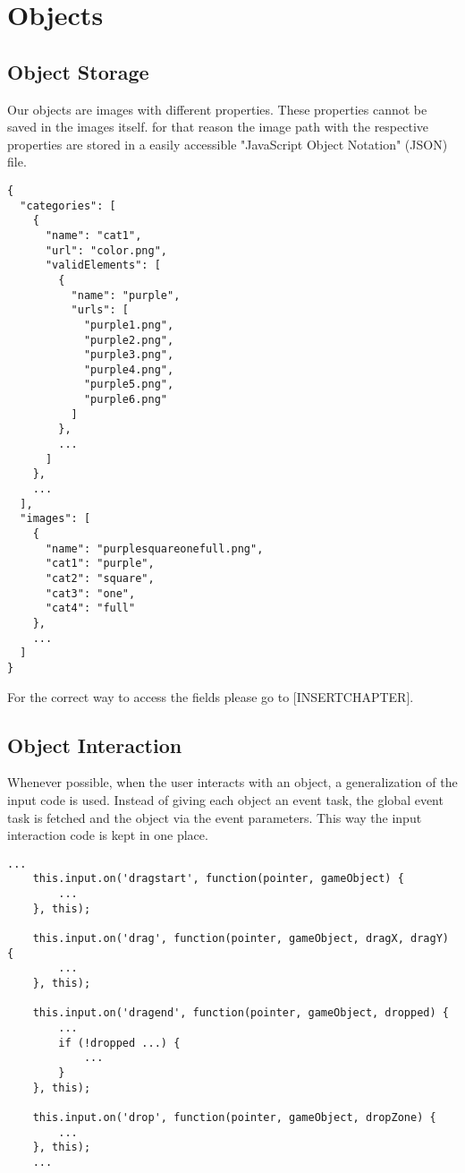 \section{Objects}\label{sec:objects}
\subsection{Object Storage}\label{subsec:object-storage}
Our objects are images with different properties.
These properties cannot be saved in the images itself.
for that reason the image path with the respective properties are stored in a easily accessible
"JavaScript Object Notation" (JSON) file.

\begin{lstlisting}[style=TypeScript, caption=geometrical_objects.json]
{
  "categories": [
    {
      "name": "cat1",
      "url": "color.png",
      "validElements": [
        {
          "name": "purple",
          "urls": [
            "purple1.png",
            "purple2.png",
            "purple3.png",
            "purple4.png",
            "purple5.png",
            "purple6.png"
          ]
        },
        ...
      ]
    },
    ...
  ],
  "images": [
    {
      "name": "purplesquareonefull.png",
      "cat1": "purple",
      "cat2": "square",
      "cat3": "one",
      "cat4": "full"
    },
    ...
  ]
}
\end{lstlisting}

For the correct way to access the fields please go to [INSERTCHAPTER].

\subsection{Object Interaction}\label{subsec:object-interaction}
Whenever possible, when the user interacts with an object, a generalization of the input code is used.
Instead of giving each object an event task, the global event task is fetched and the object via the event parameters.
This way the input interaction code is kept in one place.

\begin{lstlisting}[style=TypeScript, caption=Input code]
    ...
    this.input.on('dragstart', function(pointer, gameObject) {
        ...
    }, this);

    this.input.on('drag', function(pointer, gameObject, dragX, dragY) {
        ...
    }, this);

    this.input.on('dragend', function(pointer, gameObject, dropped) {
        ...
        if (!dropped ...) {
            ...
        }
    }, this);

    this.input.on('drop', function(pointer, gameObject, dropZone) {
        ...
    }, this);
    ...
\end{lstlisting}

